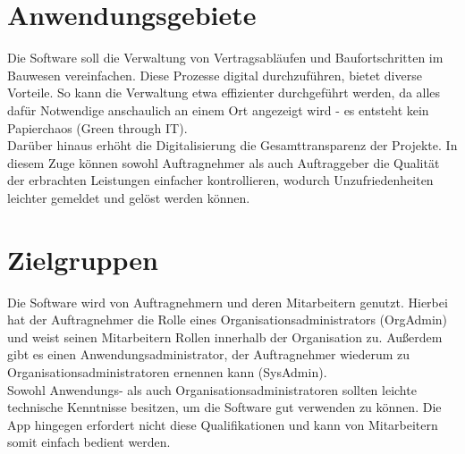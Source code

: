 \section{Anwendungsgebiete}
Die Software soll die Verwaltung von Vertragsabläufen und Baufortschritten im Bauwesen vereinfachen.
Diese Prozesse digital durchzuführen, bietet diverse Vorteile.
So kann die Verwaltung etwa effizienter durchgeführt werden, da alles dafür Notwendige anschaulich an einem Ort angezeigt wird - es entsteht kein Papierchaos (Green through IT).\\
Darüber hinaus erhöht die Digitalisierung die Gesamttransparenz der Projekte.
In diesem Zuge können sowohl Auftragnehmer als auch Auftraggeber die Qualität der erbrachten Leistungen einfacher kontrollieren, wodurch Unzufriedenheiten leichter gemeldet und gelöst werden können.

\section{Zielgruppen}
Die Software wird von Auftragnehmern und deren Mitarbeitern genutzt.
Hierbei hat der Auftragnehmer die Rolle eines Organisationsadministrators (OrgAdmin) und weist seinen Mitarbeitern Rollen innerhalb der Organisation zu.
Außerdem gibt es einen Anwendungsadministrator, der Auftragnehmer wiederum zu Organisationsadministratoren ernennen kann (SysAdmin).\\
Sowohl Anwendungs- als auch Organisationsadministratoren sollten leichte technische Kenntnisse besitzen, um die Software gut verwenden zu können.
Die App hingegen erfordert nicht diese Qualifikationen und kann von Mitarbeitern somit einfach bedient werden.
